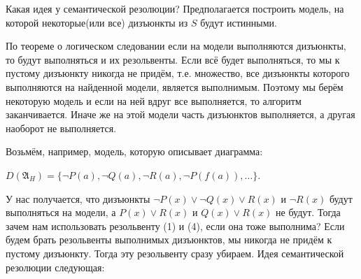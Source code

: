 \documentclass[18pt, a4paper]{extarticle}
\newcommand{\mA}{\mathfrak{A}}
\begin{document}
Какая идея у семантической резолюции? Предполагается построить модель, на которой некоторые(или все) дизъюнкты из $S$ будут истинными. 

По теореме о логическом следовании если на модели выполняются дизъюнкты, то будут выполняться и их резольвенты. Если всё будет выполняться, то мы к пустому дизъюнкту никогда не придём, т.е. множество, все дизъюнкты которого выполняются на найденной модели, является выполнимым. Поэтому мы берём некоторую модель и если на ней вдруг все выполняется, то алгоритм заканчивается. Иначе же на этой модели часть дизъюнктов выполняется, а другая наоборот не выполняется.

\newpage

Возьмём, например, модель, которую описывает диаграмма:

$D(\mA_H)=\{\lnot P(a),\lnot Q(a),\lnot R(a),\lnot P(f(a)),\dots\}$.

У нас получается, что дизъюнкты $\lnot P(x)\vee\lnot Q(x)\vee R(x)$ и $\lnot R(x)$ будут выполняться на модели, а $P(x)\vee R(x)$ и $Q(x)\vee R(x)$ не будут. Тогда зачем нам использовать резольвенту (1) и (4), если она тоже выполнима? Если будем брать резольвенты выполнимых дизъюнктов, мы никогда не придём к пустому дизъюнкту. Тогда эту резольвенту сразу убираем. Идея семантической резолюции следующая:
\end{document}
